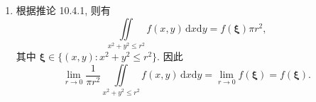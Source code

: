 \begin{enumerate}
\begin{proof}
\begin{align*}
                &= \frac12\int_0^a(a-z)^2f(z)\,\mathrm{d}z. \qedhere  
            \end{align*}
        \end{proof}
    \item %
        根据推论 10.4.1, 则有
        \[
            \iint\limits_{x^2+y^2\leq r^2}f(x,y)\,\mathrm{d}x\mathrm{d}y = f(\boldsymbol{\xi})\pi r^2,   
        \]
        其中 $\boldsymbol{\xi} \in \{(x,y) : x^2+y^2 \leq r^2\}$. 因此
        \[
            \lim_{r\to0}\frac{1}{\pi r^2} \iint\limits_{x^2+y^2\leq r^2}f(x,y)\,\mathrm{d}x\mathrm{d}y = \lim_{r\to0}f(\boldsymbol{\xi}) = f(\boldsymbol{\xi}).   
        \]
\end{enumerate}
% 
